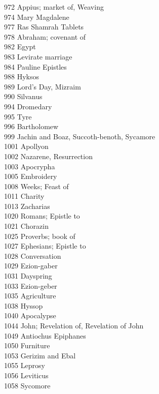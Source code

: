 972 \quad Appius; market of, Weaving\\
974 \quad Mary Magdalene\\
977 \quad Ras Shamrah Tablets\\
978 \quad Abraham; covenant of\\
982 \quad Egypt\\
983 \quad Levirate marriage\\
984 \quad Pauline Epistles\\
988 \quad Hyksos\\
989 \quad Lord’s Day, Mizraim\\
990 \quad Silvanus\\
994 \quad Dromedary\\
995 \quad Tyre\\
996 \quad Bartholomew\\
999 \quad Jachin and Boaz, Succoth-benoth, Sycamore\\
1001 \quad Apollyon\\
1002 \quad Nazarene, Resurrection\\
1003 \quad Apocrypha\\
1005 \quad Embroidery\\
1008 \quad Weeks; Feast of\\
1011 \quad Charity\\
1013 \quad Zacharias\\
1020 \quad Romans; Epistle to\\
1021 \quad Chorazin\\
1025 \quad Proverbs; book of\\
1027 \quad Ephesians; Epistle to\\
1028 \quad Conversation\\
1029 \quad Ezion-gaber\\
1031 \quad Dayspring\\
1033 \quad Ezion-geber\\
1035 \quad Agriculture\\
1038 \quad Hyssop\\
1040 \quad Apocalypse\\
1044 \quad John; Revelation of, Revelation of John\\
1049 \quad Antiochus Epiphanes\\
1050 \quad Furniture\\
1053 \quad Gerizim and Ebal\\
1055 \quad Leprosy\\
1056 \quad Leviticus\\
1058 \quad Sycomore\\
